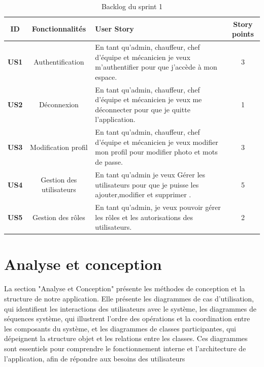 \begin{table}[H]
  \centering
  \renewcommand{\arraystretch}{1}
  \begin{tabular}{|c|c|p{7.5cm}|c|}
    \hline
    \textbf{ID}  & \textbf{Fonctionnalités} & \centering \textbf{User Story}                                                                                             & \textbf {Story points} \\
    \hline
    \textbf{US1} & Authentification         & En tant qu'admin, chauffeur, chef d'équipe et mécanicien je veux m'authentifier pour que j'accède à mon espace.            & 3                      \\
    \hline
    \textbf{US2} & Déconnexion              & En tant qu'admin, chauffeur, chef d'équipe et mécanicien je veux me déconnecter pour que je quitte l'application.          & 1                      \\
    \hline
    \textbf{US3} & Modification profil      & En tant qu'admin, chauffeur, chef d'équipe et mécanicien je veux modifier mon profil pour modifier photo et mots de passe. & 3                      \\
    \hline
    \textbf{US4} & Gestion des utilisateurs & En tant qu'admin je veux Gérer les utilisateurs pour que je puisse les ajouter,modifier et supprimer .                     & 5                      \\
    \hline
    \textbf{US5} & Gestion des rôles        & En tant qu'admin, je veux pouvoir gérer les rôles et les autorisations des utilisateurs.                                   & 2                      \\
    \hline
  \end{tabular}
  \caption{Backlog du sprint 1}

\end{table}

\newpage
\section{Analyse et conception}
La section "Analyse et Conception" présente les méthodes de conception et la structure de notre application. Elle présente les diagrammes de cas d'utilisation, qui identifient les interactions des utilisateurs avec le système, les diagrammes de séquences système, qui illustrent l'ordre des opérations et la coordination entre les composants du système, et les diagrammes de classes participantes, qui dépeignent la structure objet et les relations entre les classes. Ces diagrammes sont essentiels pour comprendre le fonctionnement interne et l'architecture de l'application, afin de  répondre aux besoins des utilisateurs

